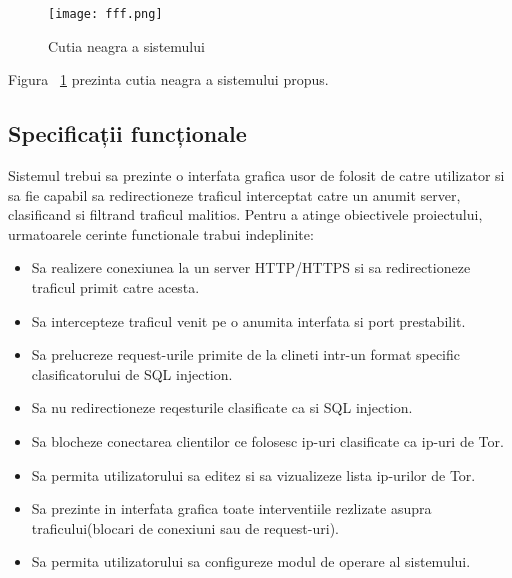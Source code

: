 \begin{figure}[h]
	\centering
	\texttt{[image: fff.png]}
	\caption{Cutia neagra a sistemului}
	\label{fig:black-box}
\end{figure}

Figura ~\ref{fig:black-box} prezinta cutia neagra a sistemului propus. \\

 \subsection{Specificații funcționale}

Sistemul trebui sa prezinte o interfata grafica usor de folosit de catre utilizator si sa fie capabil sa redirectioneze traficul interceptat catre un anumit server, clasificand si filtrand traficul malitios. Pentru a atinge obiectivele proiectului, urmatoarele cerinte functionale trabui indeplinite:
\begin{itemize}
  \item Sa realizere conexiunea la un server HTTP/HTTPS si sa redirectioneze traficul primit catre acesta.
  \item Sa intercepteze traficul venit pe o anumita interfata si port prestabilit.
  \item Sa prelucreze request-urile primite de la clineti intr-un format specific clasificatorului de SQL injection.
  \item Sa nu redirectioneze reqesturile clasificate ca si SQL injection.
  \item Sa blocheze conectarea clientilor ce folosesc ip-uri clasificate ca ip-uri de Tor.
  \item Sa permita utilizatorului sa editez si sa vizualizeze lista ip-urilor de Tor.
  \item Sa prezinte in interfata grafica toate interventiile rezlizate asupra traficului(blocari de conexiuni sau de request-uri).
  \item Sa permita utilizatorului sa configureze modul de operare al sistemului.
\end{itemize}


